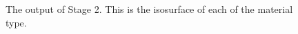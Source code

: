 \documentclass[fleqn,12pt,openany]{book}
\begin{document}
\begin{figure}
\begin{center}
\end{center}
\caption{\label{fig:tooth_stage1} The output of Stage 2.  This is the isosurface of each of the material type.}
\end{figure} 
\end{document}
